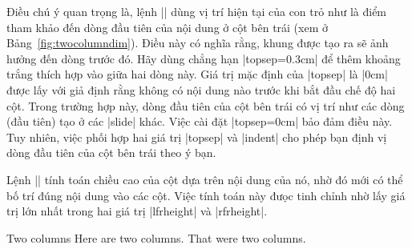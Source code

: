 Điều chú ý quan trọng là, lệnh |\twocolumn| dùng vị trí hiện tại của
con trỏ như  là điểm tham khảo đến dòng đầu tiên của nội dung ở cột
bên trái (xem ở Bảng~\vref{fig:twocolumndim}). Điều này có nghĩa rằng,
khung được tạo ra sẽ ảnh hưởng đến dòng trước đó. Hãy dùng chẳng hạn |topsep=0.3cm|
để thêm khoảng trắng thích hợp vào giữa hai dòng này. Giá trị mặc định của |topsep|
là |0cm| được lấy với giả định rằng không có nội dung nào
trước khi bắt đầu chế độ hai cột. Trong trường hợp này, dòng đầu tiên
của cột bên trái có vị trí như các dòng (đầu tiên) tạo ở các |slide| khác.
Việc cài đặt |topsep=0cm| bảo đảm điều này. Tuy nhiên, việc phối hợp
hai giá trị |topsep| và |indent| cho phép bạn định vị dòng đầu tiên của
cột bên trái theo ý bạn.

Lệnh |\twoclumn| tính toán chiều cao của cột dựa trên nội dung của nó,
nhờ đó mới có thể bố trí đúng nội dung vào các cột. Việc tính toán này
đưọc tinh chỉnh nhờ lấy giá trị lớn nhất trong hai giá trị |lfrheight| và |rfrheight|.
\begin{example}
 \begin{slide}{Two columns}
   Here are two columns.
   That were two columns.
 \end{slide}
\end{example}
\endinput
